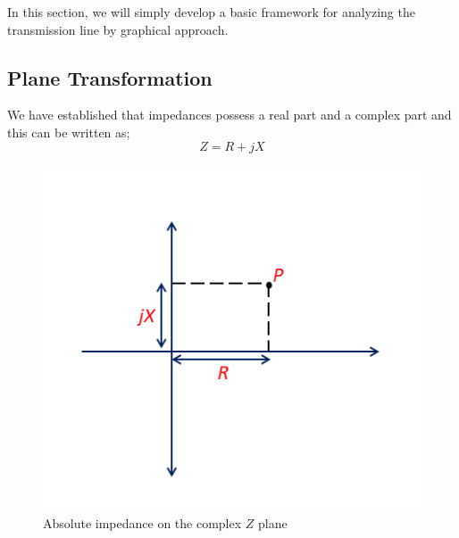 In this section, we will simply develop a basic framework for analyzing the transmission line by graphical approach.

\subsection{Plane Transformation}
We have established that impedances possess a real part and a complex part and this can be written as;
\begin{equation*}
Z= R+jX
\end{equation*}

\begin{figure}[h]
	\centering
	\includegraphics[width=0.8\linewidth]{./graphics/Z_plane1}
	\caption{Absolute impedance on the complex $Z$ plane}
	\label{fig:mjhdj}
\end{figure}

